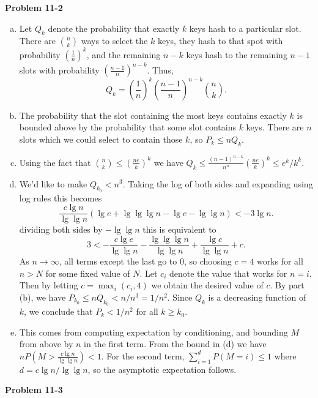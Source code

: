 \documentclass{article}
\begin{document}
\noindent\textbf{Problem 11-2}\\
\begin{enumerate}[a.]
\item Let $Q_k$ denote the probability that exactly $k$ keys hash to a particular slot.  There are ${n \choose k}$ ways to select the $k$ keys, they hash to that spot with probability $\left(\frac{1}{n}\right)^k$, and the remaining $n-k$ keys hash to the remaining $n-1$ slots with probability $\left(\frac{n-1}{n}\right)^{n-k}$. Thus,
\[ Q_k = \left(\frac{1}{n}\right)^k\left(\frac{n-1}{n}\right)^{n-k} {n \choose k}.\]

\item The probability that the slot containing the most keys contains exactly $k$ is bounded above by the probability that some slot contains $k$ keys. There are $n$ slots which we could select to contain those $k$, so $P_k \leq nQ_k$. 

\item Using the fact that ${n \choose k} \leq \left(\frac{ne}{k}\right)^k$ we have $Q_k \leq \frac{(n-1)^{n-k}}{n^n} \left(\frac{ne}{k}\right)^k \leq e^k/k^k$. 

\item  
We'd like to make $Q_{k_0} < n^3$.  Taking the log of both sides and expanding using log rules this becomes
\[ \frac{c\lg n}{\lg \lg n}(\lg e + \lg \lg \lg n - \lg c - \lg \lg n) < - 3\lg n.\]
dividing both sides by $-\lg\lg n$ this is equivalent to
\[ 3 < -\frac{c\lg e}{\lg \lg n}  - \frac{\lg \lg \lg n}{\lg \lg n} + \frac{\lg c}{\lg \lg n} + c.\]
As $n \to \infty$, all terms except the last go to 0, so choosing $c = 4$ works for all $n > N$ for some fixed value of $N$.  Let $c_i$ denote the value that works for $n = i$.  Then by letting $c = \max_i(c_i, 4)$ we obtain the desired value of $c$. By part (b), we have $P_{k_0} \leq nQ_{k_0} < n/n^3 = 1/n^2$.  Since $ Q_k$ is a decreasing function of $k$, we conclude that $P_k < 1/n^2$ for all $k \geq k_0$. 

\item This comes from computing expectation by conditioning, and bounding $M$ from above by $n$ in the first term.  From the bound in (d) we have $nP(M > \frac{c \lg n}{\lg \lg n}) < 1$.  For the second term, $\sum_{i=1}^d P(M = i) \leq 1$ where $d = c\lg n/ \lg \lg n$, so the asymptotic expectation follows. 

\end{enumerate}

\noindent\textbf{ Problem 11-3} \\
\end{document}

